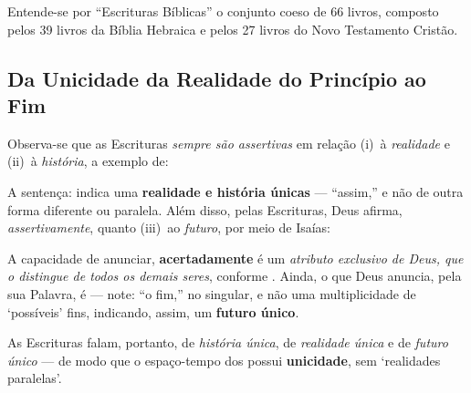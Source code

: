     Entende-se por ``Escrituras Bíblicas'' o conjunto coeso de 66 livros, composto pelos 39 livros da Bíblia Hebraica e pelos 27
    livros do Novo Testamento Cristão.


    \subsection{Da Unicidade da Realidade do Princípio ao Fim}

    Observa-se que as Escrituras \emph{sempre são assertivas} em relação (i)~à  \emph{realidade}  e  (ii)~à  \emph{história},  a
    exemplo de:


    A sentença:  indica uma \textbf{realidade e história únicas}  ---  ``assim,''  e  não  de  outra  forma
    diferente ou paralela. Além disso, pelas Escrituras, Deus afirma, \emph{assertivamente}, quanto (iii)~ao \emph{futuro},  por
    meio de Isaías:


    A capacidade de anunciar, \textbf{acertadamente}  é um  \emph{atributo  exclusivo  de
    Deus, que o distingue de todos os demais seres}, conforme . Ainda, o que Deus anuncia,
    pela sua Palavra, é  ---  note:  ``o  fim,''  no  singular,  e  não  uma  multiplicidade  de
    `possíveis' fins, indicando, assim, um \textbf{futuro único}.

    As Escrituras falam, portanto, de \emph{história única}, de \emph{realidade única} e de \emph{futuro único} --- de modo  que
    o espaço-tempo dos  possui \textbf{unicidade}, sem `realidades paralelas'.

